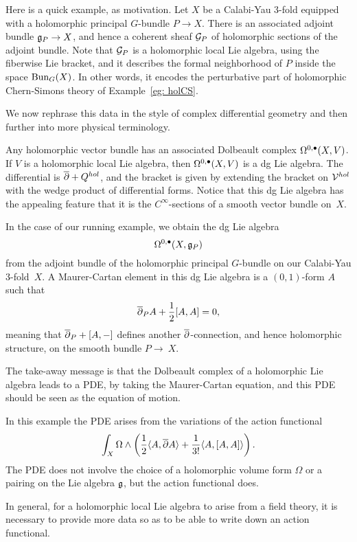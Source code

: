 \documentclass[11pt]{amsart}
\begin{document}
Here is a quick example, as motivation.
Let $X$ be a Calabi-Yau 3-fold equipped with a holomorphic principal $G$-bundle $P \to X$.
There is an associated adjoint bundle $\mathfrak g_P \to X$, and hence a coherent sheaf $\mathcal G_P$ of holomorphic sections of the adjoint bundle.
Note that $\mathcal G_P$ is a holomorphic local Lie algebra, using the fiberwise Lie bracket,
and it describes the formal neighborhood of $P$ inside the space ${\rm Bun}_G(X)$.
In other words, it encodes the perturbative part of holomorphic Chern-Simons theory of Example~\ref{eg: holCS}.

We now rephrase this data in the style of complex differential geometry and then further into more physical terminology.

Any holomorphic vector bundle has an associated Dolbeault complex $\Omega^{0,\bullet}(X,V)$. 
If $V$ is a holomorphic local Lie algebra, 
then $\Omega^{0,\bullet}(X, V)$ is a dg Lie algebra. 
The differential is ${\overline{\partial}} + Q^{hol}$, 
and the bracket is given by extending the bracket on $\mathcal V^{hol}$ with the wedge product of differential forms. 
Notice that this dg Lie algebra has the appealing feature that it is the $C^\infty$-sections of a smooth vector bundle on~$X$.

In the case of our running example, we obtain the dg Lie algebra
\[
\Omega^{0,\bullet}(X,\mathfrak g_P)
\]
from the adjoint bundle of the holomorphic principal $G$-bundle on our Calabi-Yau 3-fold~$X$.
A Maurer-Cartan element in this dg Lie algebra is a $(0,1)$-form $A$ such that
\[
{\overline{\partial}}_P A + \frac{1}{2}[A,A] = 0,
\]
meaning that ${\overline{\partial}}_P + [A,-]$ defines another ${\overline{\partial}}$-connection, and hence holomorphic structure, on the smooth bundle $P \to~X$.

The take-away message is that the Dolbeault complex of a holomorphic Lie algebra leads to a PDE, by taking the Maurer-Cartan equation,
and this PDE should be seen as the equation of motion.

In this example the PDE arises from the variations of the action functional
\[
\int_X \Omega \wedge \left( \frac{1}{2}\langle A, {\overline{\partial}} A\rangle + \frac{1}{3!}\langle A, [A,A]\rangle \right).
\]
The PDE does not involve the choice of a holomorphic volume form $\Omega$ or a pairing on the Lie algebra $\mathfrak g$, 
but the action functional does.

In general, for a holomorphic local Lie algebra to arise from a field theory,
it is necessary to provide more data so as to be able to write down an action functional.
\end{document}
